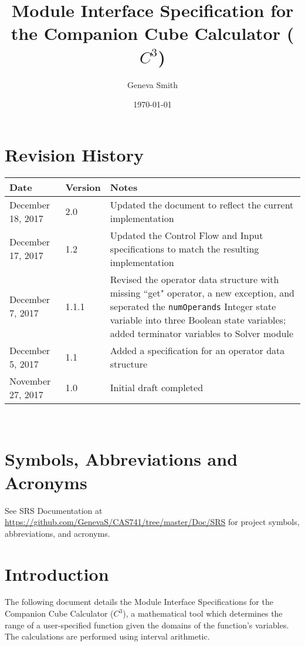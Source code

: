 \documentclass[12pt, titlepage]{article}
\newcommand{\progname}{Companion Cube Calculator}
\newcommand{\prognameAbbrv}{$C^{3}$}
\begin{document}
\title{Module Interface Specification for the \progname{} (\prognameAbbrv{})}

\author{Geneva Smith}

\date{\today}

\maketitle


\section{Revision History}

\begin{tabularx}{\textwidth}{p{3cm}p{2cm}X}
\toprule {\bf Date} & {\bf Version} & {\bf Notes}\\
\midrule
December 18, 2017 & 2.0 & Updated the document to reflect the current 
implementation \\
December 17, 2017 & 1.2 & Updated the Control Flow and Input specifications to 
match the resulting implementation \\
December 7, 2017 & 1.1.1 & Revised the operator data structure with missing 
``get" operator, a new exception, and seperated the \texttt{numOperands} 
Integer state variable into three Boolean state variables; added terminator 
variables to Solver module\\
December 5, 2017 & 1.1 & Added a specification for an operator data structure \\
November 27, 2017 & 1.0 & Initial draft completed\\
\bottomrule
\end{tabularx}

~\newpage

\section{Symbols, Abbreviations and Acronyms}

See SRS Documentation at 
\url{https://github.com/GenevaS/CAS741/tree/master/Doc/SRS} for project 
symbols, abbreviations, and acronyms.

\newpage

\tableofcontents

\newpage


\section{Introduction}
The following document details the Module Interface Specifications for the 
\progname{} (\prognameAbbrv{}), a mathematical tool which determines the range 
of a user-specified function given the domains of the function's variables. The 
calculations are performed using interval arithmetic.
\end{document}

